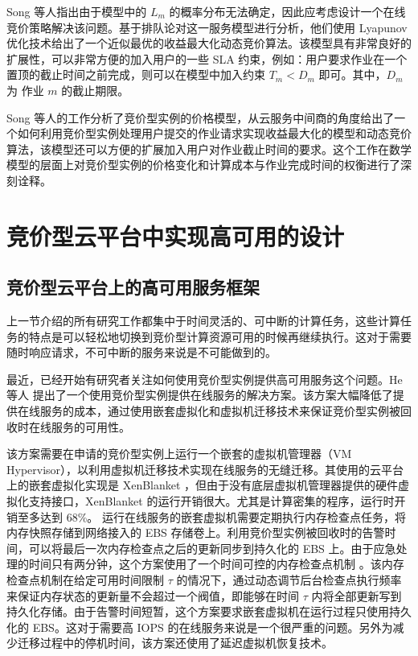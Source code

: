 Song 等人指出由于模型中的 $L_m$ 的概率分布无法确定，因此应考虑设计一个在线竞价策略解决该问题。基于排队论对这一服务模型进行分析，他们使用 Lyapunov 优化技术给出了一个近似最优的收益最大化动态竞价算法。该模型具有非常良好的扩展性，可以非常方便的加入用户的一些 SLA 约束，例如：用户要求作业在一个置顶的截止时间之前完成，则可以在模型中加入约束 $T_m < D_m$ 即可。其中，$D_m$ 为 作业 $m$ 的截止期限。

Song 等人的工作分析了竞价型实例的价格模型，从云服务中间商的角度给出了一个如何利用竞价型实例处理用户提交的作业请求实现收益最大化的模型和动态竞价算法，该模型还可以方便的扩展加入用户对作业截止时间的要求。这个工作在数学模型的层面上对竞价型实例的价格变化和计算成本与作业完成时间的权衡进行了深刻诠释。

\section{竞价型云平台中实现高可用的设计}
\subsection{竞价型云平台上的高可用服务框架}
上一节介绍的所有研究工作都集中于时间灵活的、可中断的计算任务，这些计算任务的特点是可以轻松地切换到竞价型计算资源可用的时候再继续执行。这对于需要随时响应请求，不可中断的服务来说是不可能做到的。

最近，已经开始有研究者关注如何使用竞价型实例提供高可用服务这个问题。He 等人 \cite{He:2015:CCH:2749246.2749275}  提出了一个使用竞价型实例提供在线服务的解决方案。该方案大幅降低了提供在线服务的成本，通过使用嵌套虚拟化和虚拟机迁移技术来保证竞价型实例被回收时在线服务的可用性。

该方案需要在申请的竞价型实例上运行一个嵌套的虚拟机管理器（VM Hypervisor），以利用虚拟机迁移技术实现在线服务的无缝迁移。其使用的云平台上的嵌套虚拟化实现是 XenBlanket \cite{Williams:2012:XVO:2168836.2168849}，但由于没有底层虚拟机管理器提供的硬件虚拟化支持接口，XenBlanket 的运行开销很大。尤其是计算密集的程序，运行时开销至多达到 68\%。 运行在线服务的嵌套虚拟机需要定期执行内存检查点任务，将内存快照存储到网络接入的 EBS 存储卷上。利用竞价型实例被回收时的告警时间，可以将最后一次内存检查点之后的更新同步到持久化的 EBS 上。由于应急处理的时间只有两分钟，这个方案使用了一个时间可控的内存检查点机制 \cite{Singh:2013:YEG:2482626.2482642}。该内存检查点机制在给定可用时间限制 $\tau$ 的情况下，通过动态调节后台检查点执行频率来保证内存状态的更新量不会超过一个阀值，即能够在时间 $\tau$ 内将全部更新写到持久化存储。由于告警时间短暂，这个方案要求嵌套虚拟机在运行过程只使用持久化的 EBS。这对于需要高 IOPS 的在线服务来说是一个很严重的问题。另外为减少迁移过程中的停机时间，该方案还使用了延迟虚拟机恢复技术。

